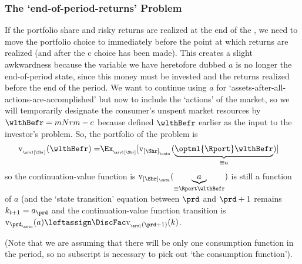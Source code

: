 \documentclass[titlepage, headings=optiontotocandhead]{econtex}
\begin{document}
\subsubsection{The `end-of-period-returns' Problem}
If the portfolio share and risky returns are realized at the end of the {\interval}, we need to move the portfolio choice {\stg} to immediately before the point at which returns are realized (and after the $\mathrm{c}$ choice has been made).  This creates a slight awkwardness because the variable we have heretofore dubbed $a$ is no longer the end-of-period state, since this money must be invested and the returns realized before the end of the period.  We want to continue using $a$ for `assets-after-all-actions-are-accomplished' but now to include the `actions' of the market, so we will temporarily designate the consumer's unspent market resources by $\wlthBefr = mNrm-c$ because defined $\wlthBefr$ earlier as the input to the investor's problem.  So, the portfolio {\stg} of the problem is
\begin{equation}\begin{gathered}\begin{aligned}
  \mathrm{v}_{_\arvl[\Shr]}(\wlthBefr) = & \Ex_{_\arvl[\Shr]}[\mathrm{v}_{[\Shr]_{_\cntn}}(\underbrace{\optml{\Rport}\wlthBefr}_{\equiv a})] %
    \end{aligned}\end{gathered}\end{equation}
so the continuation-value function is $\mathrm{v}_{[\Shr]_\cntn}(\underbrace{a}_{\equiv \Rport \wlthBefr})$ is still a function of $a$ (and
the `state transition' equation between $\prd$ and $\prd+1$ remains $k_{t+1} = a_{\prd}$ and the continuation-value function transition is $\mathrm{v}_{\prd_\cntn}(a) \leftassign \DiscFac \mathrm{v}_{_\arvl(\prd+1)}(k)$.



(Note that we are assuming that there will be only one consumption function in the period, so no {\stg} subscript is necessary to pick out `the consumption function'). 
\end{document}
